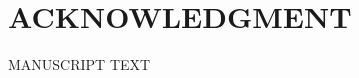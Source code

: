 \documentclass[12pt,english]{article}
\newcommand{\rrquote}{1.1}
\newcommand{\rrxspc}{1.5}
\begin{document}
\doublespacing
\section*{ACKNOWLEDGMENT}
\ACKNOWLEDGMENTS
\clearpage 

\setcounter{page}{1}
\renewcommand*{\thefootnote}{\arabic{footnote}}
\begingroup
  \centering
  \Large MANUSCRIPT TEXT\\[1em]
\endgroup




\appendix
\begin{refsection}

\setcounter{page}{1}
\end{refsection}



    
    
\end{document}
